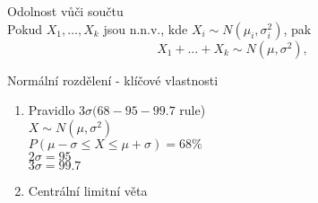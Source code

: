 \documentclass[../main.tex]{subfiles}
\begin{document}
\begin{remark}
    Odolnost vůči součtu\\

    Pokud $X_1,\dots,X_k$ jsou n.n.v., kde $X_i \sim N(\mu_i, \sigma^2_i)$, pak
    \[X_1 + \dots + X_k \sim N(\mu, \sigma^2),\]
\end{remark}

\begin{remark}
    Normální rozdělení - klíčové vlastnosti\\

    \begin{enumerate}
        \item Pravidlo $3\sigma (68-95-99.7$ rule)\\
        $X \sim N(\mu, \sigma^2)$\\
        $P(\mu-\sigma \leq X \leq \mu + \sigma) = 68 \%$\\
        $2\sigma = 95$\\
        $3\sigma = 99.7$
        
        \item Centrální limitní věta
    \end{enumerate}
\end{remark}
\end{document}
